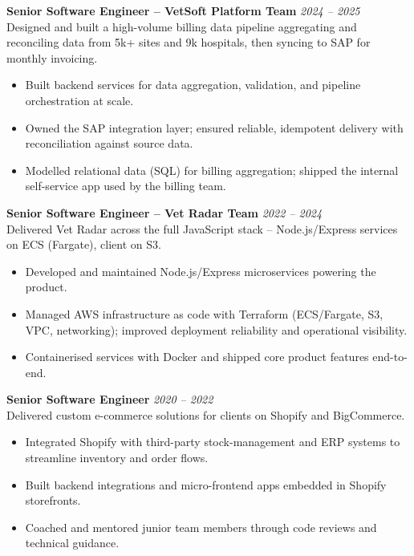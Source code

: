 \documentclass{resume}
\begin{document}
\vspace{1em}

\textbf{Senior Software Engineer -- VetSoft Platform Team} \hfill \textit{2024 -- 2025} \\
Designed and built a high-volume billing data pipeline aggregating and reconciling data from 5k+ sites and 9k hospitals, then syncing to SAP for monthly invoicing.
\begin{itemize}
  \item Built backend services for data aggregation, validation, and pipeline orchestration at scale.
  \item Owned the SAP integration layer; ensured reliable, idempotent delivery with reconciliation against source data.
  \item Modelled relational data (SQL) for billing aggregation; shipped the internal self-service app used by the billing team.
\end{itemize}

\vspace{1em}

\textbf{Senior Software Engineer -- Vet Radar Team} \hfill \textit{2022 -- 2024} \\
Delivered Vet Radar across the full JavaScript stack -- Node.js/Express services on ECS (Fargate), client on S3.
\begin{itemize}
  \item Developed and maintained Node.js/Express microservices powering the product.
  \item Managed AWS infrastructure as code with Terraform (ECS/Fargate, S3, VPC, networking); improved deployment reliability and operational visibility.
  \item Containerised services with Docker and shipped core product features end-to-end.
\end{itemize}

\vspace{1em}

\vspace{1em}
\textbf{Senior Software Engineer} \hfill \textit{2020 -- 2022} \\
Delivered custom e-commerce solutions for clients on Shopify and BigCommerce.
\begin{itemize}
  \item Integrated Shopify with third-party stock-management and ERP systems to streamline inventory and order flows.
  \item Built backend integrations and micro-frontend apps embedded in Shopify storefronts.
  \item Coached and mentored junior team members through code reviews and technical guidance.
\end{itemize}
\end{document}
